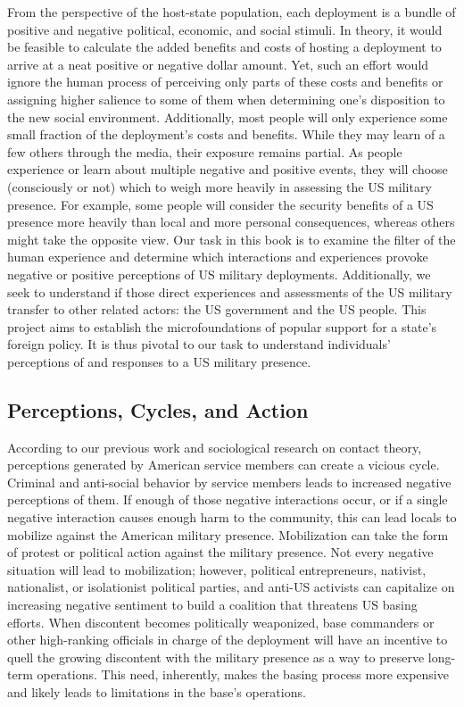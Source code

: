 From the perspective of the host-state population, each deployment is a bundle of positive and negative political, economic, and social stimuli. In theory, it would be feasible to calculate the added benefits and costs of hosting a deployment to arrive at a neat positive or negative dollar amount. Yet, such an effort would ignore the human process of perceiving only parts of these costs and benefits or assigning higher salience to some of them when determining one's disposition to the new social environment. Additionally, most people will only experience some small fraction of the deployment's costs and benefits. While they may learn of a few others through the media, their exposure remains partial. As people experience or learn about multiple negative and positive events, they will choose (consciously or not) which to weigh more heavily in assessing the US military presence. For example, some people will consider the security benefits of a US presence more heavily than local and more personal consequences, whereas others might take the opposite view. Our task in this book is to examine the filter of the human experience and determine which interactions and experiences provoke negative or positive perceptions of US military deployments.
Additionally, we seek to understand if those direct experiences and assessments of the US military transfer to other related actors: the US government and the US people. This project aims to establish the microfoundations of popular support for a state's foreign policy. It is thus pivotal to our task to understand individuals' perceptions of and responses to a US military presence.


\subsection*{Perceptions, Cycles, and Action}


According to our previous work and sociological research on contact theory, perceptions generated by American service members can create a vicious cycle. Criminal and anti-social behavior by service members leads to increased negative perceptions of them. If enough of those negative interactions occur, or if a single negative interaction causes enough harm to the community, this can lead locals to mobilize against the American military presence.  Mobilization can take the form of protest or political action against the military presence. Not every negative situation will lead to mobilization; however, political entrepreneurs, nativist, nationalist, or isolationist political parties, and anti-US activists can capitalize on increasing negative sentiment to build a coalition that threatens US basing efforts. When discontent becomes politically weaponized, base commanders or other high-ranking officials in charge of the deployment will have an incentive to quell the growing discontent with the military presence as a way to preserve long-term operations. This need, inherently, makes the basing process more expensive and likely leads to limitations in the base's operations. 

